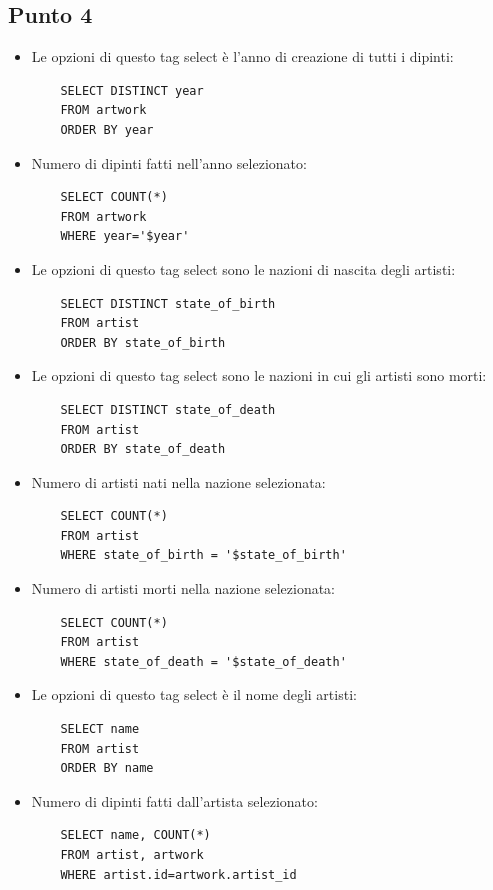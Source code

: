\documentclass{ol-softwaremanual}
\begin{document}
\subsection{Punto 4}
\begin{itemize}
    \item Le opzioni di questo tag select è l'anno di creazione di tutti i dipinti:
    \begin{verbatim}
    SELECT DISTINCT year 
    FROM artwork
    ORDER BY year
    \end{verbatim}
    \item Numero di dipinti fatti nell'anno selezionato:
    \begin{verbatim}
    SELECT COUNT(*)
    FROM artwork
    WHERE year='$year'
    \end{verbatim}
    \item Le opzioni di questo tag select sono le nazioni di nascita degli artisti:
    \begin{verbatim}
    SELECT DISTINCT state_of_birth 
    FROM artist
    ORDER BY state_of_birth
    \end{verbatim}
    \item Le opzioni di questo tag select sono le nazioni in cui gli artisti sono morti:
    \begin{verbatim}
    SELECT DISTINCT state_of_death
    FROM artist
    ORDER BY state_of_death
    \end{verbatim}
    \item Numero di artisti nati nella nazione selezionata:
    \begin{verbatim}
    SELECT COUNT(*)
    FROM artist 
    WHERE state_of_birth = '$state_of_birth'
    \end{verbatim}
    \item Numero di artisti morti nella nazione selezionata:
    \begin{verbatim}
    SELECT COUNT(*)
    FROM artist 
    WHERE state_of_death = '$state_of_death'
    \end{verbatim}
    \item Le opzioni di questo tag select è il nome degli artisti:
    \begin{verbatim}
    SELECT name
    FROM artist
    ORDER BY name
    \end{verbatim}
    \item Numero di dipinti fatti dall'artista selezionato:
    \begin{verbatim}
    SELECT name, COUNT(*)
    FROM artist, artwork 
    WHERE artist.id=artwork.artist_id

\end{verbatim}
\end{itemize}
\end{document}
